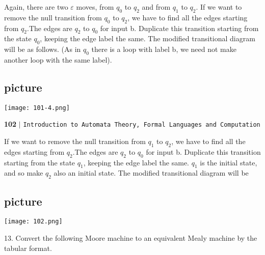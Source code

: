\documentclass{article}
\begin{document}
\vspace*{0.3cm}
Again, there are two $\varepsilon$ moves, from $q_0$ to $q_2$ and from $q_1$ to $q_2$. If we want to remove the null transition
from $q_0$ to $q_2$, we have to find all the edges starting from $q_2$.The edges are $q_2$ to $q_0$ for input b.
Duplicate this transition starting from the state $q_0$, keeping the edge label the same. The modified
transitional diagram will be as follows. (As in $q_0$ there is a loop with label b, we need not make
another loop with the same label).\\

\vspace*{0.2cm}
\begin{center}
\section{picture}
\texttt{[image: 101-4.png]}
\end{center}

\newpage

\begin{flushleft}
    \textbf{102}\hspace*{0.1cm} \textbf{$|$} \hspace*{0.1cm} \texttt{Introduction to Automata Theory, Formal Languages and Computation}
  \end{flushleft}
  \vspace*{1cm}

  If we want to remove the null transition from $q_1$ to $q_2$, we have to find all the edges starting from
$q_2$.The edges are $q_2$ to $q_0$ for input b. Duplicate this transition starting from the state $q_1$, keeping
the edge label the same. $q_1$ is the initial state, and so make $q_2$ also an initial state. The modified
transitional diagram will be\\

\vspace*{0.3cm}
\begin{center}
\section{picture}
\texttt{[image: 102.png]}
\end{center}

\vspace*{0.3cm}
13. Convert the following Moore machine to an equivalent Mealy machine by the tabular format.\\
\end{document}
